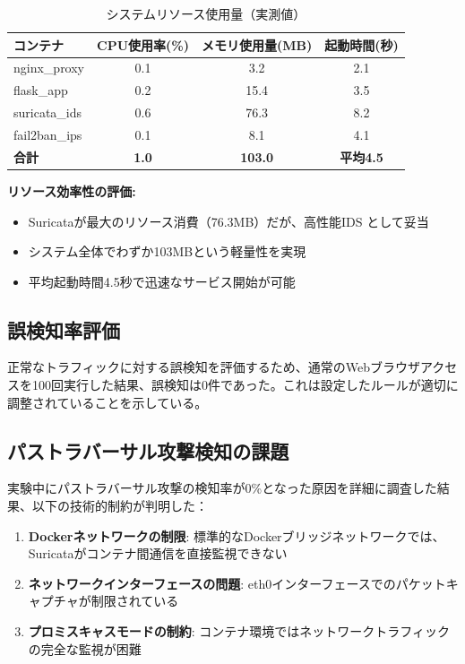 \documentclass[12pt,a4paper]{article}
\begin{document}
\begin{table}[H]
\centering
\caption{システムリソース使用量（実測値）}
\label{tab:resource_usage}
\begin{tabular}{@{}lccc@{}}
\toprule
コンテナ & CPU使用率(\%) & メモリ使用量(MB) & 起動時間(秒) \\
\midrule
nginx\_proxy & 0.1 & 3.2 & 2.1 \\
flask\_app & 0.2 & 15.4 & 3.5 \\
suricata\_ids & 0.6 & 76.3 & 8.2 \\
fail2ban\_ips & 0.1 & 8.1 & 4.1 \\
\midrule
\textbf{合計} & \textbf{1.0} & \textbf{103.0} & \textbf{平均4.5} \\
\bottomrule
\end{tabular}
\end{table}

\textbf{リソース効率性の評価:}
\begin{itemize}
    \item Suricataが最大のリソース消費（76.3MB）だが、高性能IDS として妥当
    \item システム全体でわずか103MBという軽量性を実現
    \item 平均起動時間4.5秒で迅速なサービス開始が可能
\end{itemize}

\subsection{誤検知率評価}

正常なトラフィックに対する誤検知を評価するため、通常のWebブラウザアクセスを100回実行した結果、誤検知は0件であった。これは設定したルールが適切に調整されていることを示している。

\subsection{パストラバーサル攻撃検知の課題}

実験中にパストラバーサル攻撃の検知率が0\%となった原因を詳細に調査した結果、以下の技術的制約が判明した：

\begin{enumerate}
    \item \textbf{Dockerネットワークの制限}: 標準的なDockerブリッジネットワークでは、Suricataがコンテナ間通信を直接監視できない
    \item \textbf{ネットワークインターフェースの問題}: eth0インターフェースでのパケットキャプチャが制限されている
    \item \textbf{プロミスキャスモードの制約}: コンテナ環境ではネットワークトラフィックの完全な監視が困難
\end{enumerate}
\end{document}

